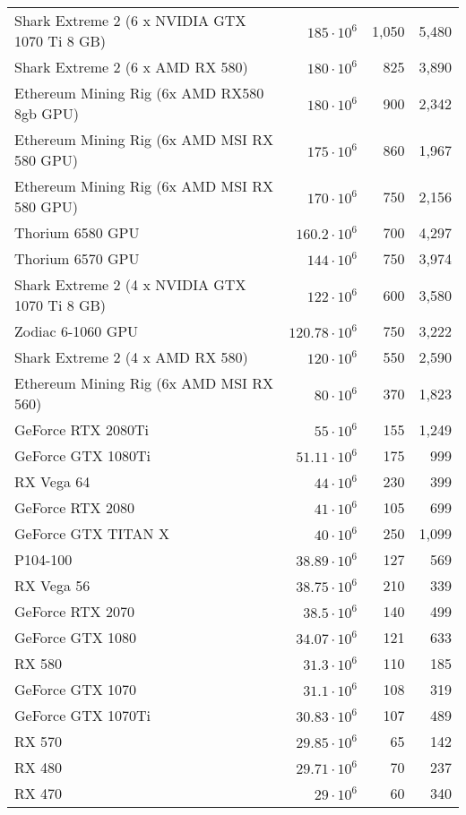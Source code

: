 \begin{longtable}{|p{}|r|r|r|}
  Shark Extreme 2 (6 x NVIDIA GTX 1070 Ti 8 GB) & $185 \cdot 10^{6}$ & 1,050 & 5,480 \\
  Shark Extreme 2 (6 x AMD RX 580) & $180 \cdot 10^{6}$ & 825 & 3,890 \\
  Ethereum Mining Rig (6x AMD RX580 8gb GPU) & $180 \cdot 10^{6}$ & 900 & 2,342 \\
  Ethereum Mining Rig (6x AMD MSI RX 580 GPU) & $175 \cdot 10^{6}$ & 860 & 1,967 \\
  Ethereum Mining Rig (6x AMD MSI RX 580 GPU) & $170 \cdot 10^{6}$ & 750 & 2,156 \\
  Thorium 6580 GPU & $160.2 \cdot 10^{6}$ & 700 & 4,297 \\
  Thorium 6570 GPU & $144 \cdot 10^{6}$ & 750 & 3,974 \\
  Shark Extreme 2 (4 x NVIDIA GTX 1070 Ti 8 GB) & $122 \cdot 10^{6}$ & 600 & 3,580 \\
  Zodiac 6-1060 GPU & $120.78 \cdot 10^{6}$ & 750 & 3,222 \\
  Shark Extreme 2 (4 x AMD RX 580) & $120 \cdot 10^{6}$ & 550 & 2,590 \\
  Ethereum Mining Rig (6x AMD MSI RX 560) & $80 \cdot 10^{6}$ & 370 & 1,823 \\
  GeForce RTX 2080Ti & $55 \cdot 10^{6}$ & 155 & 1,249 \\
  GeForce GTX 1080Ti & $51.11 \cdot 10^{6}$ & 175 & 999 \\
  RX Vega 64 & $44 \cdot 10^{6}$ & 230 & 399 \\
  GeForce RTX 2080 & $41 \cdot 10^{6}$ & 105 & 699 \\
  GeForce GTX TITAN X & $40 \cdot 10^{6}$ & 250 & 1,099 \\
  P104-100 & $38.89 \cdot 10^{6}$ & 127 & 569 \\
  RX Vega 56 & $38.75 \cdot 10^{6}$ & 210 & 339 \\
  GeForce RTX 2070 & $38.5 \cdot 10^{6}$ & 140 & 499 \\
  GeForce GTX 1080 & $34.07 \cdot 10^{6}$ & 121 & 633 \\
  RX 580 & $31.3 \cdot 10^{6}$ & 110 & 185 \\
  GeForce GTX 1070 & $31.1 \cdot 10^{6}$ & 108 & 319 \\
  GeForce GTX 1070Ti & $30.83 \cdot 10^{6}$ & 107 & 489 \\
  RX 570 & $29.85 \cdot 10^{6}$ & 65 & 142 \\
  RX 480 & $29.71 \cdot 10^{6}$ & 70 & 237 \\
  RX 470 & $29 \cdot 10^{6}$ & 60 & 340 \\

\end{longtable}
